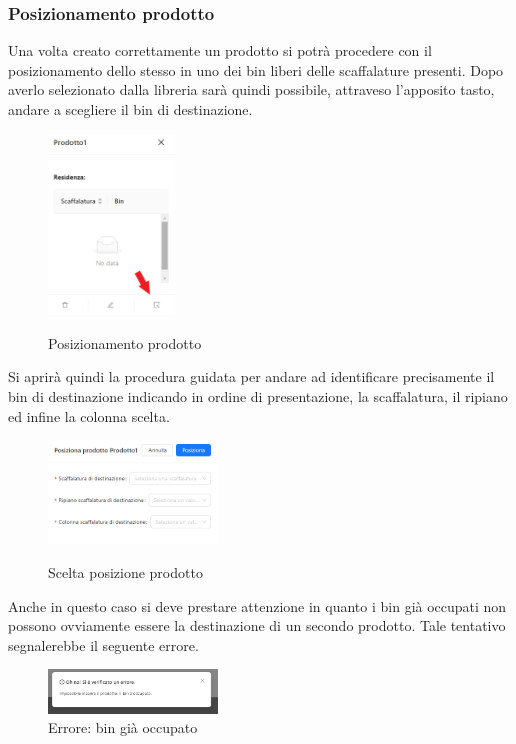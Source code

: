         \subsubsection{Posizionamento prodotto}\label{sec:prodotti:posizionamento}
        \noindent Una volta creato correttamente un prodotto si potrà procedere con il posizionamento dello stesso in uno dei bin liberi delle scaffalature presenti.
        Dopo averlo selezionato dalla libreria sarà quindi possibile, attraveso l'apposito tasto, andare a scegliere il bin di destinazione. 
        \begin{figure}[h!]
            \centering
            \includegraphics[width=0.3\textwidth]{images/tasto_posizionamento.png}
            \label{riposizionamento}
            \caption{Posizionamento prodotto}
        \end{figure}
        
        \noindent Si aprirà quindi la procedura guidata per andare ad identificare precisamente il bin di destinazione indicando in ordine di presentazione, la
        scaffalatura, il ripiano ed infine la colonna scelta.\\
        \begin{figure}[h!]
            \centering
            \includegraphics[width=0.4\textwidth]{images/scelta_posizione_prodotto.png}
            \label{destinazione_prodotto}
            \caption{Scelta posizione prodotto}
        \end{figure}
        
        \noindent Anche in questo caso si deve prestare attenzione in quanto i bin già occupati non possono ovviamente essere la destinazione di un secondo prodotto. 
        Tale tentativo segnalerebbe il seguente errore.\\
        \begin{figure}[h!]
            \centering
            \includegraphics[width=0.4\textwidth]{images/bin_occupato.png}
            \caption{Errore: bin già occupato}
        \end{figure}
        


